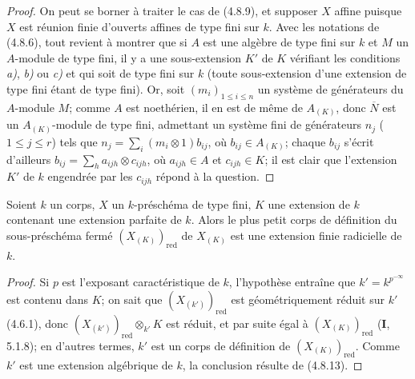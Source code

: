 \begin{proof}
On peut se borner à traiter le cas de (4.8.9), et supposer $X$ affine puisque
$X$ est réunion finie d'ouverts affines de type fini sur $k$. Avec les
notations de (4.8.6), tout revient à montrer que si $A$ est une algèbre de
type fini sur $k$ et $M$ un $A$-module de type fini, il y a une sous-extension
$K'$ de $K$ vérifiant les conditions \emph{a)}, \emph{b)} ou \emph{c)} et qui soit de type fini sur
$k$ (toute sous-extension d'une extension de type fini étant de type fini).
Or, soit $(m_i)_{1\leq i\leq n}$ un système de générateurs du $A$-module $M$;
comme $A$ est noethérien, il en est de même de $A_{(K)}$, donc $\overline N$
est un $A_{(K)}$-module de type fini, admettant un système fini de générateurs
$n_j$ ($1\leq j\leq r$) tels que
$n_j=\sum_i(m_i\otimes1)b_{ij}$,
où $b_{ij}\in A_{(K)}$;
chaque $b_{ij}$ s'écrit d'ailleurs
$b_{ij}=\sum_h a_{ijh}\otimes c_{ijh}$,
où $a_{ijh}\in A$ et $c_{ijh}\in K$;
il est clair que l'extension $K'$ de $k$ engendrée par les $c_{ijh}$ répond à
la question.
\end{proof}

\begin{proposition}[4.8.14]
\label{IV.2.4.8.14-fr}
Soient $k$ un corps, $X$ un $k$-préschéma de type fini, $K$ une extension de
$k$ contenant une extension parfaite de $k$. Alors le plus petit corps de
définition du sous-préschéma fermé $(X_{(K)})_{\mathrm{red}}$ de $X_{(K)}$
est une extension finie radicielle de $k$.
\end{proposition}

\begin{proof}
Si $p$ est l'exposant caractéristique de $k$, l'hypothèse entraîne que
$k'=k^{p^{-\infty}}$ est contenu dans $K$; on sait que
$(X_{(k')})_{\mathrm{red}}$ est géométriquement réduit sur $k'$ (4.6.1), donc
$(X_{(k')})_{\mathrm{red}}\otimes_{k'}K$ est réduit, et par suite égal à
$(X_{(K)})_{\mathrm{red}}$ (\textbf{I}, 5.1.8); en d'autres termes, $k'$ est un corps
de définition de $(X_{(K)})_{\mathrm{red}}$. Comme $k'$ est une extension
algébrique de $k$, la conclusion résulte de (4.8.13).
\end{proof}

